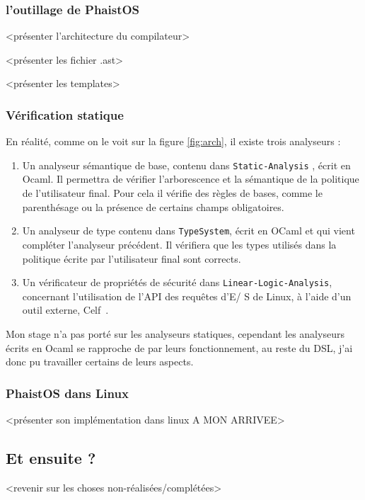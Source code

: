 \subsubsection{l'outillage de PhaistOS}

<présenter l'architecture du compilateur>

<présenter les fichier .ast>

<présenter les templates>

\subsubsection{Vérification statique}

En réalité, comme on le voit sur la figure \ref{fig:arch}, il existe trois 
analyseurs : 
\begin{enumerate}
    \item Un analyseur sémantique de base, contenu dans \texttt{Static-Analysis}
    , écrit en Ocaml. Il permettra de vérifier l'arborescence et la sémantique 
    de la politique de l'utilisateur final. Pour cela il vérifie des règles de 
    bases, comme le parenthésage ou la présence de certains champs obligatoires.
    \item Un analyseur de type contenu dans \texttt{TypeSystem}, écrit en OCaml 
    et qui vient compléter l'analyseur précédent. Il vérifiera que les types 
    utilisés dans la politique écrite par l'utilisateur final sont corrects.
    \item Un vérificateur de propriétés de sécurité dans \texttt
    {Linear-Logic-Analysis}, concernant l'utilisation de l'API des requêtes d'E/
    S de Linux, à l'aide d'un outil externe, Celf~\cite{schack2008celf}.
\end{enumerate}
Mon stage n'a pas porté sur les analyseurs statiques, cependant les analyseurs 
écrits en Ocaml se rapproche de par leurs fonctionnement, au reste du DSL, j'ai 
donc pu travailler certains de leurs aspects.


\subsubsection{PhaistOS dans Linux}

<présenter son implémentation dans linux A MON ARRIVEE>

\subsection{Et ensuite ?}

<revenir sur les choses non-réalisées/complétées>

